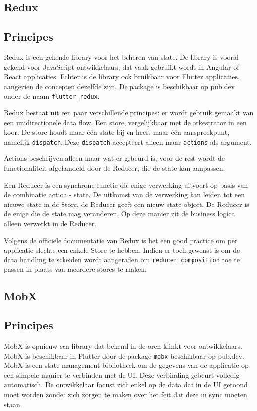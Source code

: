 \subsection{Redux}
\subsection*{Principes}
Redux is een gekende library voor het beheren van state. De library is vooral gekend voor JavaScript ontwikkelaars, dat vaak gebruikt wordt in Angular of React applicaties. Echter is de library ook bruikbaar voor Flutter applicaties, aangezien de concepten dezelfde zijn. De package is beschikbaar op pub.dev onder de naam \verb|flutter_redux|.

Redux bestaat uit een paar verschillende principes: er wordt gebruik gemaakt van een unidirectionele data flow. Een store, vergelijkbaar met de orkestrator in een koor. De store houdt maar één state bij en heeft maar één aanspreekpunt, namelijk \verb|dispatch|. Deze \verb|dispatch| accepteert alleen maar \verb|actions| als argument.

Actions beschrijven alleen maar wat er gebeurd is, voor de rest wordt de functionaliteit afgehandeld door de Reducer, die de state kan aanpassen.

Een Reducer is een synchrone functie die enige verwerking uitvoert op basis van de combinatie action - state. De uitkomst van de verwerking kan leiden tot een nieuwe state in de Store, de Reducer geeft een nieuw state object. De Reducer is de enige die de state mag veranderen. Op deze manier zit de business logica alleen verwerkt in de Reducer. 

Volgens de officiële documentatie van Redux is het een good practice om per applicatie slechts een enkele Store te hebben. Indien er toch gewenst is om de data handling te scheiden wordt aangeraden om \verb|reducer composition| toe te passen in plaats van meerdere stores te maken.

\subsection{MobX}
\subsection*{Principes}
MobX is opnieuw een library dat bekend in de oren klinkt voor ontwikkelaars. MobX is beschikbaar in Flutter door de package \verb|mobx| beschikbaar op pub.dev. MobX is een state management bibliotheek om de gegevens van de applicatie op een simpele manier te verbinden met de UI. Deze verbinding gebeurt volledig automatisch. De ontwikkelaar focust zich enkel op de data dat in de UI getoond moet worden zonder zich zorgen te maken over het feit dat deze in sync moeten staan.

